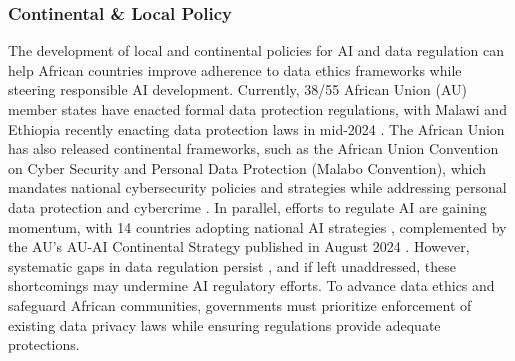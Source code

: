 \subsubsection{Continental \& Local Policy}
The development of local and continental policies for AI and data regulation can help African countries improve adherence to data ethics frameworks while steering responsible AI development. 
Currently, 38/55 African Union (AU) member states have enacted formal data protection regulations, with Malawi and Ethiopia recently enacting data protection laws in mid-2024 \cite{okolo2024operationalizing}. The African Union has also released continental frameworks, such as the African Union Convention on Cyber Security and Personal Data Protection (Malabo Convention), which mandates national cybersecurity policies and strategies while addressing personal data protection and cybercrime \cite{malaboconvention}. 
In parallel, efforts to regulate AI are gaining momentum, with 14 countries adopting national AI strategies \cite{ECDPM-Africa}, complemented by the AU’s AU-AI Continental Strategy published in August 2024 \cite{african_union2024continental}. However, systematic gaps in data regulation persist \cite{okolo2024operationalizing, eke2022responsible, john2021technology, osakwe2021strengthening}, and if left unaddressed, these shortcomings may undermine AI regulatory efforts. To advance data ethics and safeguard African communities, governments must prioritize enforcement of existing data privacy laws while ensuring regulations provide adequate protections.


